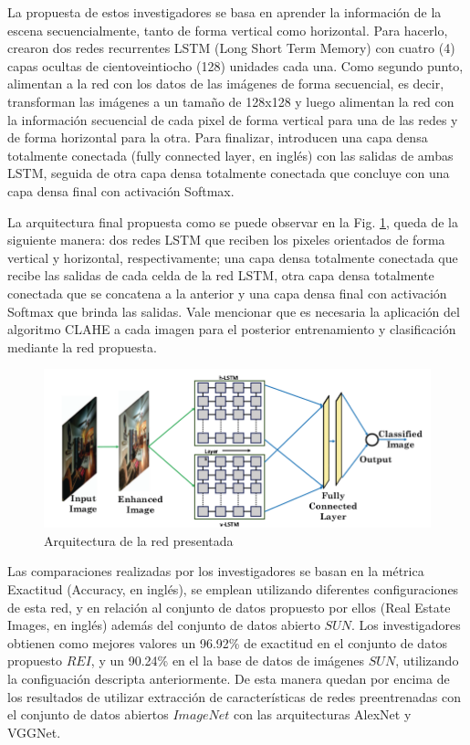 La propuesta de estos investigadores se basa en aprender la información de la escena secuencialmente, tanto de forma vertical como horizontal. Para hacerlo, crearon dos redes recurrentes LSTM (Long Short Term Memory) con cuatro (4) capas ocultas de cientoveintiocho (128) unidades cada una. Como segundo punto, alimentan a la red con los datos de las imágenes de forma secuencial, es decir, transforman las imágenes a un tamaño de 128x128 y luego alimentan la red con la información secuencial de cada pixel de forma vertical para una de las redes y de forma horizontal para la otra. Para finalizar, introducen una capa densa totalmente conectada (fully connected layer, en inglés) con las salidas de ambas LSTM, seguida de otra capa densa totalmente conectada que concluye con una capa densa final con activación Softmax.

La arquitectura final propuesta como se puede observar en la Fig. \ref{fig:lstmarchitecture}, queda de la siguiente manera: dos redes LSTM que reciben los pixeles orientados de forma vertical y horizontal, respectivamente; una capa densa totalmente conectada que recibe las salidas de cada celda de la red LSTM, otra capa densa totalmente conectada que se concatena a la anterior y una capa densa final con activación Softmax que brinda las salidas.
Vale mencionar que es necesaria la aplicación del algoritmo CLAHE a cada imagen para el posterior entrenamiento y clasificación mediante la red propuesta.

\begin{figure}[h]
	\centering
	\includegraphics[width=1\linewidth,height=0.3\textheight]{images/lstm_architecture}
	\caption[Arquitectura de la red presentada]{Arquitectura de la red presentada}
	\label{fig:lstmarchitecture}
\end{figure}

Las comparaciones realizadas por los investigadores se basan en la métrica Exactitud (Accuracy, en inglés), se emplean utilizando diferentes configuraciones de esta red, y en relación al conjunto de datos propuesto por ellos (Real Estate Images, en inglés) además del conjunto de datos abierto \(SUN\). Los investigadores obtienen como mejores valores un 96.92\% de exactitud en el conjunto de datos propuesto \(REI\), y un 90.24\% en el la base de datos de imágenes \(SUN\), utilizando la configuación descripta anteriormente.
De esta manera quedan por encima de los resultados de utilizar extracción de características de redes preentrenadas con el conjunto de datos abiertos \(ImageNet\) con las arquitecturas AlexNet y VGGNet.

